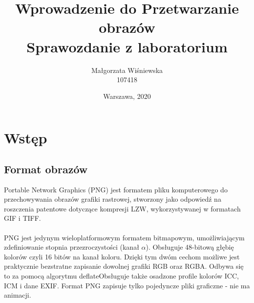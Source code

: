 \documentclass[a4paper,12pt, titlepage]{report}
\title{Wprowadzenie do Przetwarzanie obrazów\\Sprawozdanie z laboratorium}
\author{Małgorzata Wiśniewska\\107418}
\date{Warszawa, 2020}
\begin{document}
\maketitle
\tableofcontents
\chapter{Wstęp}
\section{Format obrazów}
\par Portable Network Graphics (PNG) jest formatem pliku komputerowego do przechowywania obrazów grafiki rastrowej, stworzony jako odpowiedź na roszczenia patentowe dotyczące kompresji LZW, wykorzystywanej w formatach GIF i TIFF. \\\\PNG jest jedynym wieloplatformowym formatem bitmapowym, umożliwiającym zdefiniowanie stopnia przezroczystości (kanał \(\alpha\)). Obsługuje 48-bitową głębię kolorów czyli 16 bitów na kanał koloru. Dzięki tym dwóm cechom możliwe jest praktycznie bezstratne zapisanie dowolnej grafiki RGB oraz RGBA. Odbywa się to za pomocą algorytmu deflateObsługuje także osadzone profile kolorów ICC, ICM i dane EXIF. Format PNG zapisuje tylko pojedyncze pliki graficzne - nie ma animacji.
\end{document}
